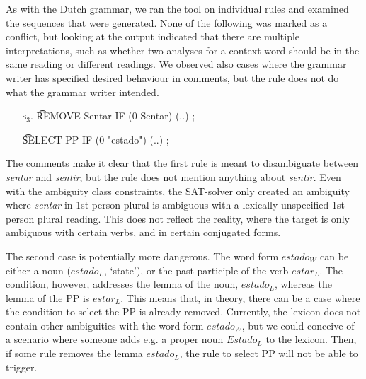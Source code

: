 {{As with the Dutch grammar, we ran the tool on individual rules and
examined the sequences that were generated. None of the following was
marked as a conflict, but looking at the output indicated that there
are multiple interpretations, such as whether two analyses for a
context word should be in the same reading or different readings.
We observed also cases where the grammar writer has specified desired
behaviour in comments, but the rule does not do what the grammar
writer intended.

\begin{itemize}
\item[\textsc{s$_3$.}] \t{REMOVE Sentar IF (0 Sentar) (..) ;}
\item[] \t{SELECT PP IF (0 "estado") (..) ;}
\end{itemize}

The comments make it clear that the first rule is meant to
disambiguate between \emph{sentar} and \emph{sentir}, but the rule
does not mention anything about \emph{sentir}.  Even with the
ambiguity class constraints, the SAT-solver only created an ambiguity
where \emph{sentar} in 1st person plural is ambiguous with a lexically
unspecified 1st person plural reading.  This does not reflect the
reality, where the target is only ambiguous with certain verbs, and in
certain conjugated forms.

The second case is potentially more dangerous.  The word form
$estado_{W}$ can be either a noun ($estado_{L}$, `state'), or the past
participle of the verb $estar_{L}$.  The condition, however, addresses
the lemma of the noun, $estado_L$, whereas the lemma of the PP is
$estar_{L}$.  This means that, in theory, there can be a case where
the condition to select the PP is already removed. Currently, the
lexicon does not contain other ambiguities with the word form
$estado_{W}$, but we could conceive of a scenario where someone adds
e.g. a proper noun $Estado_{L}$ to the lexicon. Then, if some rule
removes the lemma $estado_{L}$, the rule to select PP will not be able
to trigger.





}}
